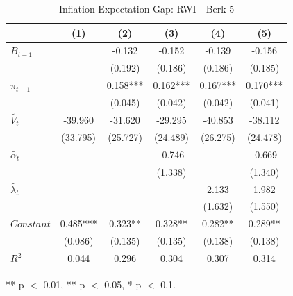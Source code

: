 \documentclass[review]{elsarticle}
\begin{document}
\begin{table}[!ht]
\centering 
  \caption{Inflation Expectation Gap: RWI - Berk 5} 
  \label{tab:Inflation Expectation Gap}
\begin{tabular}{l*{5}{c}}   
\toprule
                    & (1) & (2) & (3) & (4) & (5) \\
\midrule
$B_{t-1}$           &     & -0.132 & -0.152 & -0.139 & -0.156 \\
                    &     & (0.192) & (0.186) & (0.186) & (0.185) \\
$\pi_{t-1}$         &     & 0.158*** & 0.162*** & 0.167*** & 0.170*** \\
                    &     & (0.045) & (0.042) & (0.042) & (0.041) \\
$\tilde{V_t}$       & -39.960 & -31.620 & -29.295 & -40.853 & -38.112 \\
                    & (33.795) & (25.727) & (24.489) & (26.275) & (24.478) \\
$\tilde{\alpha_t}$  &     &     & -0.746 &     & -0.669 \\
                    &     &     & (1.338) &     & (1.340) \\
$\tilde{\lambda_t}$ &     &     &     & 2.133 & 1.982 \\
                    &     &     &     & (1.632) & (1.550) \\
$Constant$          & 0.485*** & 0.323** & 0.328** & 0.282** & 0.289** \\
                    & (0.086) & (0.135) & (0.135) & (0.138) & (0.138) \\
\midrule
$R^2$               & 0.044 & 0.296 & 0.304 & 0.307 & 0.314 \\
\bottomrule
\end{tabular} 
\parbox{0.8\textwidth}{\centering \small *** p $<$ 0.01, ** p $<$ 0.05, * p $<$ 0.1.}
\end{table}
\end{document}
